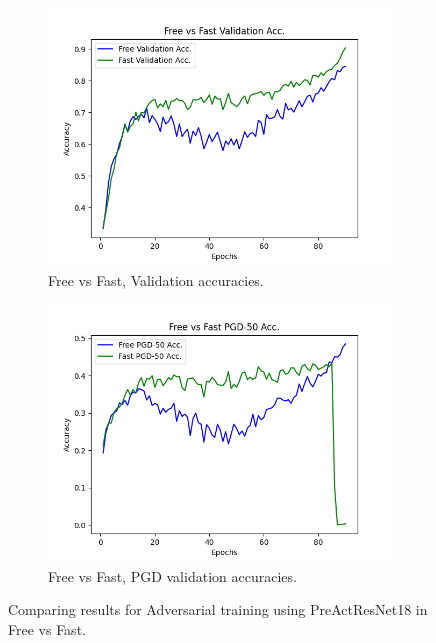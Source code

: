 \documentclass{article}
\begin{document}
\begin{figure}[hbt!]
  \centering
  \begin{subfigure}[b]{0.4\linewidth}
    \includegraphics[width=\linewidth]{images/preComp/Figure_1.png}
    \caption{ Free vs Fast, Validation accuracies.}
  \end{subfigure}
  \begin{subfigure}[b]{0.4\linewidth}
    \includegraphics[width=\linewidth]{images/preComp/Figure_2.png}
    \caption{Free vs Fast, PGD validation accuracies.}
  \end{subfigure}
  \caption{Comparing results for Adversarial training using PreActResNet18 in Free vs Fast.}
  \label{fig:coffee}
\end{figure}
\end{document}
